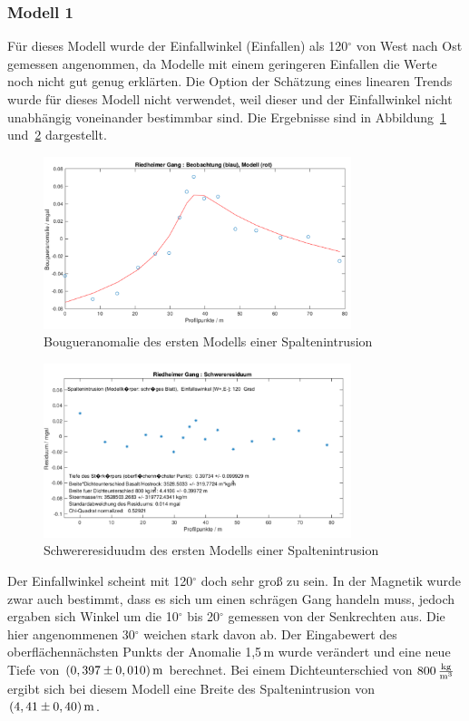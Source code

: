 \subsubsection{Modell 1}

Für dieses Modell wurde der Einfallwinkel (Einfallen) als 120$^\circ$ von West nach Ost gemessen angenommen, da Modelle mit einem geringeren Einfallen die Werte noch nicht gut genug erklärten. Die Option der Schätzung eines linearen Trends wurde für dieses Modell nicht verwendet, weil dieser und der Einfallwinkel nicht unabhängig voneinander bestimmbar sind. Die Ergebnisse sind in Abbildung~\ref{fig:modell1} und~\ref{fig:modell1_res} dargestellt.

\begin{figure}[!ht]
 \centering
 \includegraphics[width=0.8\textwidth]{fig/modell1}
 \caption{Bougueranomalie des ersten Modells einer Spaltenintrusion}
 \label{fig:modell1}
\end{figure}

\begin{figure}[!ht]
 \centering
 \includegraphics[width=0.8\textwidth]{fig/modell1_res}
 \caption{Schwereresiduudm des ersten Modells einer Spaltenintrusion}
 \label{fig:modell1_res}
\end{figure}

Der Einfallwinkel scheint mit 120$^\circ$ doch sehr groß zu sein. In der Magnetik wurde zwar auch bestimmt, dass es sich um einen schrägen Gang handeln muss, jedoch ergaben sich Winkel um die 10$^\circ$ bis 20$^\circ$ gemessen von der Senkrechten aus. Die hier angenommenen 30$^\circ$ weichen stark davon ab. Der Eingabewert des oberflächennächsten Punkts der Anomalie 1,5\,m wurde verändert und eine neue Tiefe von $(0,397\pm0,010)\,\mathrm{m}$ berechnet. Bei einem Dichteunterschied von $800\,\frac{\mathrm{kg}}{\mathrm{m^3}}$ ergibt sich bei diesem Modell eine Breite des Spaltenintrusion von $(4,41\pm0,40)\,\mathrm{m}$.

